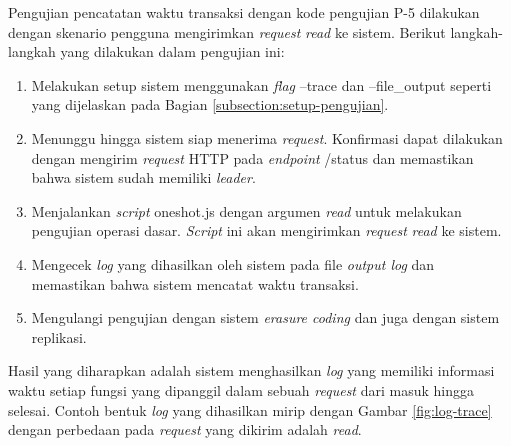 Pengujian pencatatan waktu transaksi dengan kode pengujian P-5 dilakukan dengan skenario pengguna mengirimkan \textit{request} \textit{read} ke sistem. Berikut langkah-langkah yang dilakukan dalam pengujian ini:

\begin{enumerate}
	\item Melakukan setup sistem menggunakan \textit{flag} --trace dan --file\_output seperti yang dijelaskan pada Bagian \ref{subsection:setup-pengujian}.
	\item Menunggu hingga sistem siap menerima \textit{request}. Konfirmasi dapat dilakukan dengan mengirim \textit{request} HTTP pada \textit{endpoint} /status dan memastikan bahwa sistem sudah memiliki \textit{leader}.
	\item Menjalankan \textit{script} oneshot.js dengan argumen \textit{read} untuk melakukan pengujian operasi dasar. \textit{Script} ini akan mengirimkan \textit{request} \textit{read} ke sistem.
	\item Mengecek \textit{log} yang dihasilkan oleh sistem pada file \textit{output log} dan memastikan bahwa sistem mencatat waktu transaksi.
	\item Mengulangi pengujian dengan sistem \textit{erasure coding} dan juga dengan sistem replikasi.
\end{enumerate}

Hasil yang diharapkan adalah sistem menghasilkan \textit{log} yang memiliki informasi waktu setiap fungsi yang dipanggil dalam sebuah \textit{request} dari masuk hingga selesai. Contoh bentuk \textit{log} yang dihasilkan mirip dengan Gambar \ref{fig:log-trace} dengan perbedaan pada \textit{request} yang dikirim adalah \textit{read}.